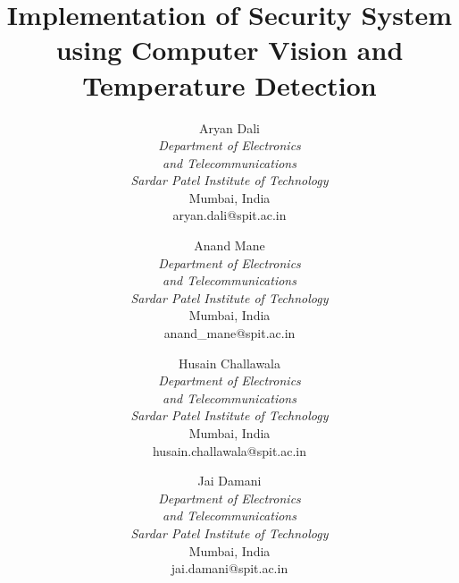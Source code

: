 \documentclass[conference]{IEEEtran}
\begin{document}
	
	\title{Implementation of Security System using Computer Vision and Temperature Detection}
	
	
	\author{
		Aryan Dali\\
		\textit{Department of Electronics}\\
		\textit{and Telecommunications}\\
		\textit{Sardar Patel Institute of Technology}\\
		Mumbai, India\\
		aryan.dali@spit.ac.in
		\and
		Anand Mane\\
		\textit{Department of Electronics}\\
		\textit{and Telecommunications}\\
		\textit{Sardar Patel Institute of Technology}\\
		Mumbai, India\\
		anand\_mane@spit.ac.in
		\and
		Husain Challawala\\
		\textit{Department of Electronics}\\
		\textit{and Telecommunications}\\
		\textit{Sardar Patel Institute of Technology}\\
		Mumbai, India\\
		husain.challawala@spit.ac.in\\
		\and
		\hspace{6.3cm}Jai Damani\\
		\hspace{6.3cm}\textit{Department of Electronics}\\
		\hspace{6.3cm}\textit{and Telecommunications}\\
		\hspace{6.3cm}\textit{Sardar Patel Institute of Technology}\\
		\hspace{6.3cm}Mumbai, India\\
		\hspace{6.3cm}jai.damani@spit.ac.in\\
	}
	
	
	\maketitle
	
\end{document}
